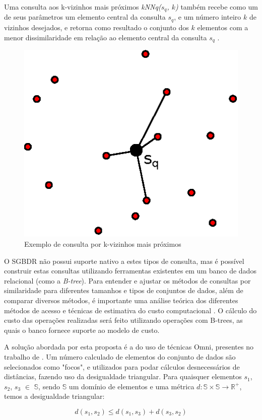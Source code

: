 Uma consulta aos k-vizinhos mais próximos \textit{kNNq($s_q$, $k$)} também recebe como um de seus parâmetros um elemento central da consulta $s_q$, e um número inteiro $k$ de vizinhos desejados, e retorna
como resultado o conjunto dos $k$ elementos com a menor dissimilaridade em relação ao elemento central da consulta $s_q$ \cite{POLA2010}.
\newpage
\begin{figure}[ht]
\centering
\captionsetup{width=0.50\textwidth, font=footnotesize, textfont=bf}
\includegraphics[width=.3\textwidth]{dados/figuras/knnq.eps}
\caption{Exemplo de consulta por k-vizinhos mais próximos}
\label{fig:exemploknnq}
\end{figure}

O SGBDR não possui suporte nativo a estes tipos de consulta, mas é possível construir estas consultas utilizando ferramentas existentes em um banco de dados relacional (como a \textit{B-tree}).
Para entender e ajustar os métodos de consultas por similaridade para diferentes tamanhos e tipos de conjuntos de dados, além de comparar diversos métodos, é importante uma análise teórica dos diferentes
métodos de acesso e técnicas de estimativa do custo computacional \cite{POLA2010}. O cálculo do custo das operações realizadas será feito utilizando operações com B-trees, as quais o banco fornece suporte
ao modelo de custo.

A solução abordada por esta proposta é a do uso de técnicas Omni, presentes no trabalho de \cite{Traina2001}. Um número calculado de elementos do conjunto de dados são selecionados como "focos", e utilizados para
podar cálculos desnecessários de distâncias, fazendo uso da desigualdade triangular. Para quaisquer elementos $s_1$, $s_2$, $s_3$ $\in$ $\mathbb{S}$, sendo $\mathbb{S}$ um domínio de elementos
e uma métrica $d : \mathbb{S} \times \mathbb{S} \rightarrow \mathbb{R^+}$, temos a desigualdade triangular:

\begin{equation} \label{eq:destri}
		d(s_1,s_2) \leq d(s_1,s_3) + d(s_3,s_2)
\end{equation}
\par

